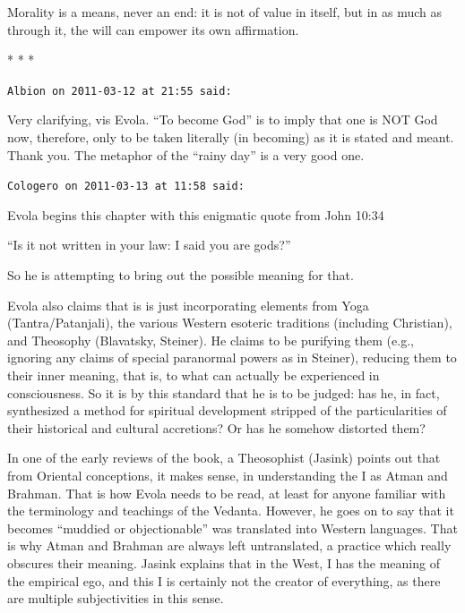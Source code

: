 \begin{quotex}
Morality is a means, never an end: it is not of value in itself, but in as much as through it, the will can empower its own affirmation.
\end{quotex}




\begin{center}* * *\end{center}

\begin{footnotesize}
\begin{sffamily}
\texttt{Albion on 2011-03-12 at 21:55 said:}

Very clarifying, vis Evola. ``To become God'' is to imply that one is NOT God now, therefore, only to be taken literally (in becoming) as it is stated and meant. Thank you. The metaphor of the ``rainy day'' is a very good one.

\hfill

\texttt{Cologero on 2011-03-13 at 11:58 said:}

Evola begins this chapter with this enigmatic quote from John 10:34

``Is it not written in your law: I said you are gods?''

So he is attempting to bring out the possible meaning for that.

Evola also claims that is is just incorporating elements from Yoga (Tantra/Patanjali), the various Western esoteric traditions (including Christian), and Theosophy (Blavatsky, Steiner). He claims to be purifying them (e.g., ignoring any claims of special paranormal powers as in Steiner), reducing them to their inner meaning, that is, to what can actually be experienced in consciousness. So it is by this standard that he is to be judged: has he, in fact, synthesized a method for spiritual development stripped of the particularities of their historical and cultural accretions? Or has he somehow distorted them?

In one of the early reviews of the book, a Theosophist (Jasink) points out that from Oriental conceptions, it makes sense, in understanding the I as Atman and Brahman. That is how Evola needs to be read, at least for anyone familiar with the terminology and teachings of the Vedanta. However, he goes on to say that it becomes ``muddied or objectionable'' was translated into Western languages. That is why Atman and Brahman are always left untranslated, a practice which really obscures their meaning. Jasink explains that in the West, I has the meaning of the empirical ego, and this I is certainly not the creator of everything, as there are multiple subjectivities in this sense.


\end{sffamily}
\end{footnotesize}

